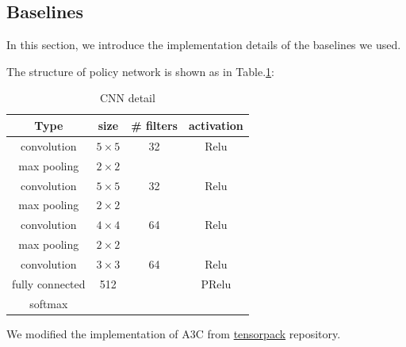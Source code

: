 \subsection{Baselines}

In this section, we introduce the implementation details of the baselines we used.

The structure of policy network is shown as in Table.\ref{table.cnn_detail}:

\begin{table}[!ht]
	\centering
	\caption{CNN detail}
	\label{table.cnn_detail}
	\begin{tabular}{c|c|c|c}
		\textbf{Type} & \textbf{size} & \textbf{\# filters} & \textbf{activation} \\ \hline
		convolution & $5\times5$ & 32 & Relu \\ 
		max pooling & $2\times2$ &  &  \\
		convolution & $5\times5$ & 32 & Relu \\
		max pooling & $2\times2$ &  &  \\
		convolution & $4\times4$ & 64 & Relu \\
		max pooling & $2\times2$ &  &  \\
		convolution & $3\times3$ & 64 & Relu \\
		fully connected & 512 &  & PRelu \\
		softmax &  &  & 
	\end{tabular}
\end{table}
We modified the implementation of A3C from \href{https://github.com/ppwwyyxx/tensorpack}{tensorpack} repository.


